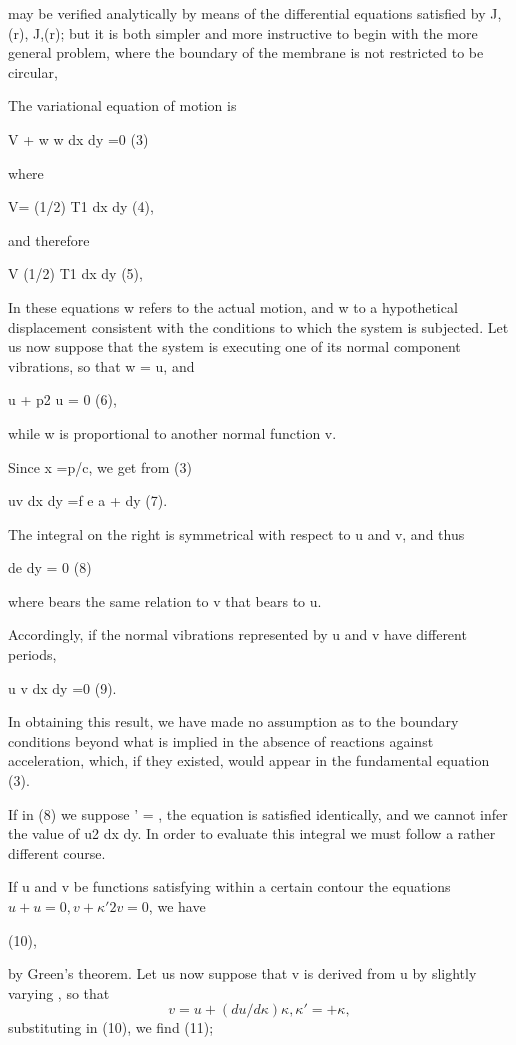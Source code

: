 may be verified analytically by means of the differential equations
satisfied by J, (r), J,(r); but it is both simpler and more instructive
to begin with the more general problem, where the boundary of the
membrane is not restricted to be circular,

The variational equation of motion is

V + w w dx dy =0 (3)

where

V= (1/2) T1 dx dy (4),

and therefore

V (1/2) T1 dx dy (5),

In these equations w refers to the actual motion, and w to a
hypothetical displacement consistent with the conditions to which the
system is subjected. Let us now suppose that the system is executing one
of its normal component vibrations, so that w = u, and

u + p2 u = 0 (6),

while w is proportional to another normal function v.

Since x =p/c, we get from (3)

uv dx dy =f e a + dy (7).

The integral on the right is symmetrical with respect to u and v, and
thus

de dy = 0 (8)

where bears the same relation to v that bears to u.

Accordingly, if the normal vibrations represented by u and v have
different periods,

u v dx dy =0 (9).

In obtaining this result, we have made no assumption as to the boundary
conditions beyond what is implied in the absence of reactions against
acceleration, which, if they existed, would appear in the fundamental
equation (3).

If in (8) we suppose ' = , the equation is satisfied identically, and we
cannot infer the value of u2 dx dy. In order to evaluate this integral
we must follow a rather different course.

If u and v be functions satisfying within a certain contour the
equations \(u+ u=0, v+ \kappa' 2 v=0\), we have

(10),

by Green's theorem. Let us now suppose that v is derived from u by
slightly varying , so that
\[ v = u + (du/d \kappa) \kappa, \kappa' = + \kappa,\]
substituting in (10), we find (11);

